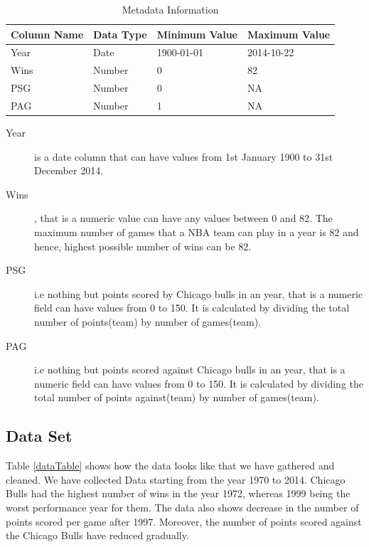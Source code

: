\documentclass[a4paper]{article}
\begin{document}
\begin{table}[h]
\begin{center}
\begin{tabular}{|l | l | l | l| }
\hline
Column Name & Data Type & Minimum Value & Maximum Value\\
\hline
Year & Date & 1900-01-01 & 2014-10-22\\
Wins & Number & 0 & 82\\
PSG & Number & 0 & NA\\
PAG & Number & 1 & NA\\
\hline
\end{tabular}
\end{center}
\caption{Metadata Information}
\label{metaTable}
\end{table}
\begin{description}
\item [Year] is a date column that can have values from 1st January 1900 to 31st December 2014.
\item [Wins], that is a numeric value can have any values between 0 and 82. The maximum number of games that a NBA team can play in a year is 82 and hence, highest possible number of wins can be 82.
\item [PSG] i.e nothing but points scored by Chicago bulls in an year, that is a numeric field can have values from 0 to 150. It is calculated by dividing the total number of points(team) by number of games(team). 
\item [PAG] i.e nothing but points scored against Chicago bulls in an year, that is a numeric field can have values from 0 to 150. It is calculated by dividing the total number of points against(team) by number of games(team). 
\end{description}

\subsection{Data Set}

Table \ref{dataTable} shows how the data looks like that we have gathered and cleaned. 
We have collected Data starting from the year 1970 to 2014. 
Chicago Bulls had the highest number of wins in the year 1972, whereas 1999 being the worst performance year for them. The data also shows decrease in the number of points scored per game after 1997. Moreover, the number of points scored against the Chicago Bulls have reduced gradually.
\end{document}
